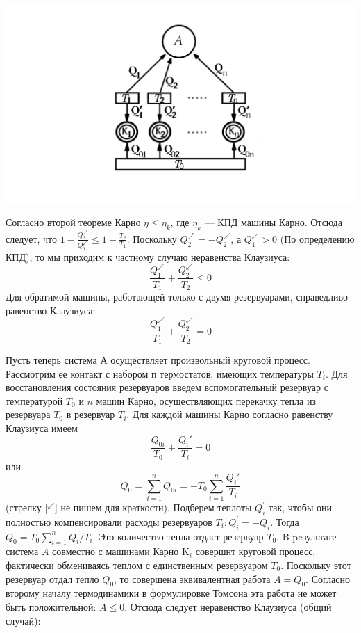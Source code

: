 \documentclass[a4paper,14pt]{article} %
\begin{document}
\begin{center}
	{\centering \includegraphics[scale=0.2]{PICTURE_2.jpg}}	
\end{center}

Согласно второй теореме Карно $\eta \leq \eta_k$, где $\eta_k$ — КПД машины Карно. Отсюда следует, что $1 - \frac{Q_2^\nearrow}{Q_1^\swarrow} \leq 1 - \frac{T_2}{T_1}$. Поскольку $Q_2^\nearrow = - Q_2^\swarrow$, а $Q_1^\swarrow > 0$ (По определению КПД), то мы приходим к частному случаю неравенства Клаузиуса:
\[\frac{Q_1^\swarrow}{T_1} + \frac{Q_2^\swarrow}{T_2} \leq 0\]
Для обратимой машины, работающей
только с двумя резервуарами, справедливо равенство Клаузиуса:
\[\frac{Q_1^\swarrow}{T_1} + \frac{Q_2^\swarrow}{T_2} = 0\]

Пусть теперь система А осуществляет произвольный круговой процесс. Рассмотрим ее контакт с набором $п$ термостатов, имеющих температуры $T_i$. Для восстановления состояния резервуаров введем вспомогательный резервуар с температурой $T_0$ и $n$ машин Карно, осуществляющих перекачку тепла из резервуара $T_0$ в резервуар $T_i$. Для каждой машины Карно согласно равенству Клаузиуса имеем
\[\frac{Q_{0i}}{T_0} + \frac{Q_i'}{T_i} = 0\]
или
\[Q_0 = \sum\limits_{i = 1}^n Q_{0i} = -T_0\sum\limits_{i=1}^n \frac {Q_i'}{T_i}\]
(стрелку [$^{\swarrow}$] не пишем для краткости). Подберем теплоты $Q_{i}^{\prime}$ так, чтобы они полностью компенсировали расходы резервуаров $T_{i}: Q_{i}^{\prime}=-Q_{i} .$ Тогда $Q_{0}=T_{0} \sum_{i=1}^{n} Q_{i} / T_{i} .$ Это количество тепла отдаст резервуар $T_{0} .$ B peзультате система $A$ совместно с машинами Карно $\mathrm{K}_{i}$ совершнт круговой процесс, фактически обмениваясь теплом с единственным резервуаром $T_{0}$. Поскольку этот резервуар отдал тепло $Q_{0}$, то совершена эквивалентная работа $A=Q_{0} .$ Согласно второму началу термодинамики в формулировке Томсона эта работа не может быть положительной: $A \leqslant 0 .$ Отсюда следует неравенство Клаузиуса (общий случай):
\end{document}
